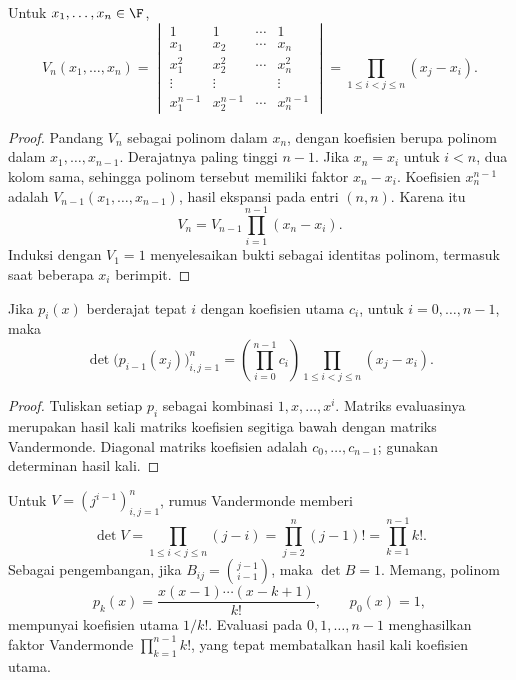 \begin{thm}[Vandermonde]
      \label{det:rumus-vandermonde}
      Untuk $x_1,\ldots,x_n\in\F$,
      \[
            V_n(x_1,\ldots,x_n)=
            \begin{vmatrix}
                  1         & 1         & \cdots & 1         \\x_1&x_2&\cdots&x_n\\
                  x_1^2     & x_2^2     & \cdots & x_n^2     \\
                  \vdots    & \vdots    &        & \vdots    \\
                  x_1^{n-1} & x_2^{n-1} & \cdots & x_n^{n-1}
            \end{vmatrix}
            =\prod_{1\le i<j\le n}(x_j-x_i).
      \]
\end{thm}
\begin{proof}
      Pandang $V_n$ sebagai polinom dalam $x_n$, dengan koefisien berupa polinom
      dalam $x_1,\ldots,x_{n-1}$. Derajatnya paling tinggi $n-1$.
      Jika $x_n=x_i$ untuk $i<n$, dua kolom sama, sehingga polinom tersebut
      memiliki faktor $x_n-x_i$. Koefisien $x_n^{n-1}$ adalah
      $V_{n-1}(x_1,\ldots,x_{n-1})$, hasil ekspansi pada entri $(n,n)$.
      Karena itu
      \[
            V_n=V_{n-1}\prod_{i=1}^{n-1}(x_n-x_i).
      \]
      Induksi dengan $V_1=1$ menyelesaikan bukti sebagai identitas polinom,
      termasuk saat beberapa $x_i$ berimpit.
\end{proof}

\begin{prop}
      Jika $p_i(x)$ berderajat tepat $i$ dengan koefisien utama $c_i$,
      untuk $i=0,\ldots,n-1$, maka
      \[
            \det\bigl(p_{i-1}(x_j)\bigr)_{i,j=1}^n
            =\left(\prod_{i=0}^{n-1}c_i\right)
            \prod_{1\le i<j\le n}(x_j-x_i).
      \]
\end{prop}
\begin{proof}
      Tuliskan setiap $p_i$ sebagai kombinasi $1,x,\ldots,x^i$.
      Matriks evaluasinya merupakan hasil kali matriks koefisien segitiga
      bawah dengan matriks Vandermonde. Diagonal matriks koefisien adalah
      $c_0,\ldots,c_{n-1}$; gunakan determinan hasil kali.
\end{proof}

\begin{exam}
      Untuk $V=(j^{i-1})_{i,j=1}^n$, rumus Vandermonde memberi
      \[
            \det V=\prod_{1\le i<j\le n}(j-i)
            =\prod_{j=2}^n(j-1)!=\prod_{k=1}^{n-1}k!.
      \]
      Sebagai pengembangan, jika $B_{ij}=\binom{j-1}{i-1}$, maka
      $\det B=1$. Memang, polinom
      \[
            p_k(x)=\frac{x(x-1)\cdots(x-k+1)}{k!},\qquad p_0(x)=1,
      \]
      mempunyai koefisien utama $1/k!$. Evaluasi pada $0,1,\ldots,n-1$
      menghasilkan faktor Vandermonde $\prod_{k=1}^{n-1}k!$, yang tepat
      membatalkan hasil kali koefisien utama.
\end{exam}

